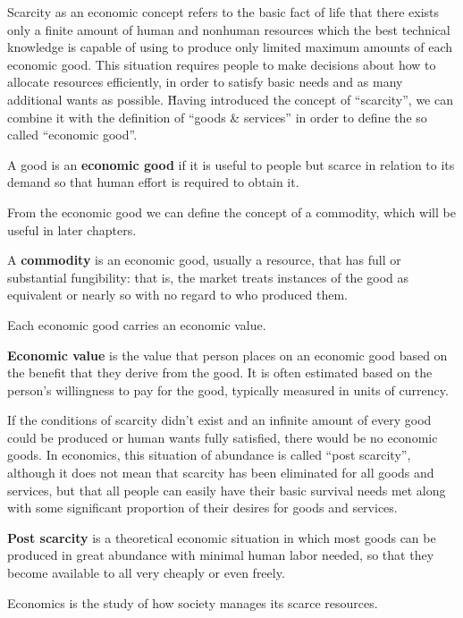 Scarcity as an economic concept refers to the basic fact of life that there exists only a finite amount of human and
nonhuman resources which the best technical knowledge is capable of using to produce only limited maximum amounts of
each economic good. This situation requires people to make decisions about how to allocate resources efficiently, in
order to satisfy basic needs and as many additional wants as possible. \v

Having introduced the concept of ``scarcity'', we can combine it with the definition of ``goods \& services'' in
order to define the so called ``economic good''.

A good is an \textbf{economic good} if it is useful to people but scarce in relation to its demand so that human effort
is required to obtain it.
\ed

From the economic good we can define the concept of a commodity, which will be useful in later chapters.

\bd[Commodity]
A \textbf{commodity} is an economic good, usually a resource, that has full or substantial fungibility: that is, the
market treats instances of the good as equivalent or nearly so with no regard to who produced them.
\ed

Each economic good carries an economic value.

\label{eqn:economic_value}
\textbf{Economic value} is the value that person places on an economic good based on the benefit that they derive
from the good. It is often estimated based on the person's willingness to pay for the good, typically measured in
units of currency.
\ed

If the conditions of scarcity didn't exist and an infinite amount of every good could be produced or human wants
fully satisfied, there would be no economic goods. In economics, this situation of abundance is called ``post
scarcity'', although it does not mean that scarcity has been eliminated for all goods and services, but that all
people can easily have their basic survival needs met along with some significant proportion of their desires for
goods and services.

\textbf{Post scarcity} is a theoretical economic situation in which most goods can be produced in great abundance
with minimal human labor needed, so that they become available to all very cheaply or even freely.
\ed

Economics is the study of how society manages its scarce resources.

